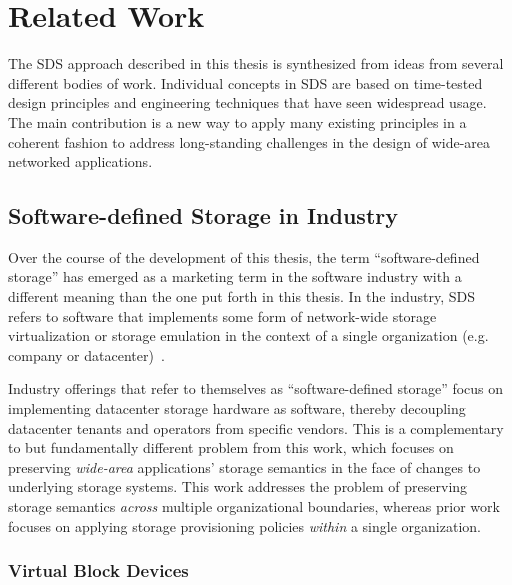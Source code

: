 
\chapter{Related Work}
\label{chap:related-work}

The SDS approach described in this thesis
is synthesized from ideas from several different bodies of work.  Individual
concepts in SDS are based on time-tested design principles and engineering
techniques that have seen widespread usage.  The main contribution is
a new way to apply many existing principles in a coherent fashion
to address long-standing challenges in
the design of wide-area networked applications.

\section{Software-defined Storage in Industry}

Over the course of the development of this thesis, the term ``software-defined
storage'' has emerged as a marketing term in the software
industry with a different meaning than the one put forth in this thesis.
In the industry, SDS refers to software that implements some form of 
network-wide storage virtualization or storage emulation
in the context of a single organization (e.g. company or datacenter)~\cite{techcenter-sds-definition}.

Industry offerings that refer to themselves as ``software-defined storage''
focus on implementing datacenter storage hardware as software, thereby
decoupling datacenter tenants and operators from specific vendors.  This is a
complementary to but fundamentally different problem from this work, which
focuses on preserving \emph{wide-area} applications' storage semantics in the face of
changes to underlying storage systems.  This work addresses the problem of
preserving storage semantics \emph{across} multiple organizational boundaries, whereas
prior work focuses on applying storage provisioning policies \emph{within} a
single organization.

\subsection{Virtual Block Devices}

